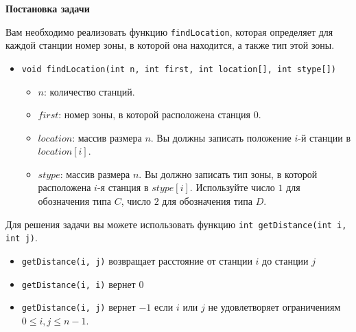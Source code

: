 \textbf{Постановка задачи}

Вам необходимо реализовать функцию \texttt{findLocation}, которая определяет для каждой
станции номер зоны, в которой она находится, а также тип этой зоны.


\begin{itemize}
\item \texttt{void findLocation(int n, int first, int location[], int stype[])} 
\begin{itemize}
\item $n$: количество станций.
\item $first$: номер зоны, в которой расположена станция $0$.
\item $location$: массив размера $n$. Вы должны записать положение $i$-й станции в $location[i]$.
\item $stype$: массив размера $n$. Вы должно записать тип зоны, в которой расположена $i$-я станция в $stype[i]$. Используйте число $1$ для обозначения типа $C$, число $2$ для
обозначения типа $D$.
\end{itemize}
\end{itemize}

Для решения задачи вы можете использовать функцию \texttt{int getDistance(int i, int j)}.

\begin{itemize}
\item \texttt{getDistance(i, j)} возвращает расстояние от станции $i$ до станции $j$
\item \texttt{getDistance(i, i)} вернет $0$
\item \texttt{getDistance(i, j)} вернет $-1$ если $i$ или $j$ не удовлетворяет ограничениям $0 \le i, j \le n - 1$.
\end{itemize}
